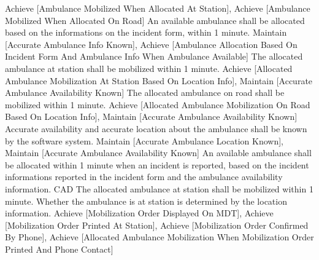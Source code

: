 	 {Achieve [Ambulance Mobilized When Allocated At Station], Achieve [Ambulance Mobilized When Allocated On Road]}
\stopkaosspec
\startkaosspec
	 {An available ambulance shall be allocated based on the informations on the incident form, within 1 minute.}
	 {Maintain [Accurate Ambulance Info Known], Achieve [Ambulance Allocation Based On Incident Form And Ambulance Info When Ambulance Available]}
\stopkaosspec
\startkaosspec
	 {The allocated ambulance at station shall be mobilized within 1 minute.}
	 {Achieve [Allocated Ambulance Mobilization At Station Based On Location Info], Maintain [Accurate Ambulance Availability Known]}
\stopkaosspec
\startkaosspec
	 {The allocated ambulance on road shall be mobilized within 1 minute.}
	 {Achieve [Allocated Ambulance Mobilization On Road Based On Location Info], Maintain [Accurate Ambulance Availability Known]}
\stopkaosspec
\startkaosspec
	 {Accurate availability and accurate location about the ambulance shall be known by the software system.}
	 {Maintain [Accurate Ambulance Location Known], Maintain [Accurate Ambulance Availability Known]}
\stopkaosspec
\startkaosspec
	 {An available ambulance shall be allocated within 1 minute when an incident is reported, based on the incident informations reported in the incident form and the ambulance availability information.}
	 {CAD}
\stopkaosspec
\startkaosspec
	 {The allocated ambulance at station shall be mobilized within 1 minute. Whether the ambulance is at station is determined by the location information.}
	 {Achieve [Mobilization Order Displayed On MDT], Achieve [Mobilization Order Printed At Station], Achieve [Mobilization Order Confirmed By Phone], Achieve [Allocated Ambulance Mobilization When Mobilization Order Printed And Phone Contact]}
\stopkaosspec
\startkaosspec
